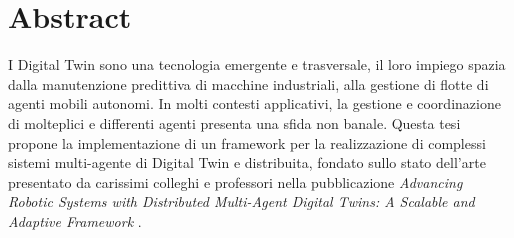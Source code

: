 \chapter*{Abstract} %

I Digital Twin sono una tecnologia emergente e trasversale, il loro impiego spazia dalla manutenzione predittiva di macchine industriali, alla gestione di flotte di agenti mobili autonomi. In molti contesti applicativi, la gestione e coordinazione di molteplici e differenti agenti presenta una sfida non banale. Questa tesi propone la implementazione di un framework per la realizzazione di complessi sistemi multi-agente di Digital Twin e distribuita, fondato sullo stato dell'arte presentato da carissimi colleghi e professori nella pubblicazione \textit{Advancing Robotic Systems with Distributed Multi-Agent Digital Twins: A Scalable and Adaptive Framework} \cite{Russo2025}.



% 
% 
% 
% 